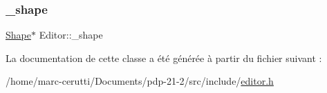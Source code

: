 \subsubsection{\texorpdfstring{\+\_\+shape}{\_shape}}
{\footnotesize\ttfamily \hyperlink{class_shape}{Shape}$\ast$ Editor\+::\+\_\+shape\hspace{0.3cm}{\ttfamily [protected]}}



La documentation de cette classe a été générée à partir du fichier suivant \+:\begin{DoxyCompactItemize}
\item 
/home/marc-\/cerutti/\+Documents/pdp-\/21-\/2/src/include/\hyperlink{editor_8h}{editor.\+h}\end{DoxyCompactItemize}
